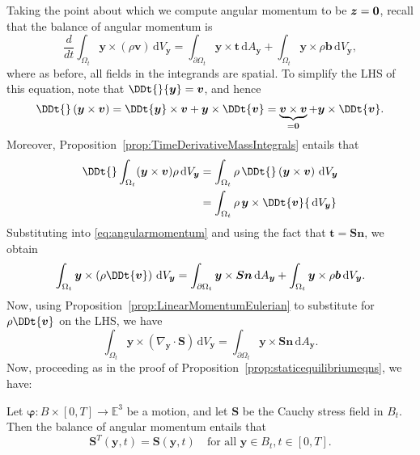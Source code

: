\documentclass[
  letterpaper,
  DIV=11,
  numbers=noendperiod]{scrreprt}
\theoremstyle{plain}
\theoremstyle{remark}
\begin{document}
Taking the point about which we compute angular momentum to be
\({\boldsymbol{z}}=\bf0\), recall that the balance of angular momentum
is \[\label{eq:angularmomentum}
  \frac{d}{dt}\int_{\Omega_t}{\boldsymbol{y}}\times (\rho{\boldsymbol{v}}){\,{\mathrm{d}}V_{{\boldsymbol{y}}}}=\int_{\partial\Omega_t}{\boldsymbol{y}}\times {\boldsymbol{t}}{\,{\mathrm{d}}A_{{\boldsymbol{y}}}}+\int_{\Omega_t}{\boldsymbol{y}}\times \rho{\boldsymbol{b}}{\,{\mathrm{d}}V_{{\boldsymbol{y}}}},\]
where as before, all fields in the integrands are spatial. To simplify
the LHS of this equation, note that
\(\DDt{}{\boldsymbol{y}}= {\boldsymbol{v}}\), and hence
\[\DDt{}\left({\boldsymbol{y}}\times{\boldsymbol{v}}\right) = \DDt{{\boldsymbol{y}}}\times{\boldsymbol{v}}+{\boldsymbol{y}}\times\DDt{{\boldsymbol{v}}} =\underbrace{{\boldsymbol{v}}\times{\boldsymbol{v}}}_{=\bf0}+ {\boldsymbol{y}}\times\DDt{{\boldsymbol{v}}}.\]
Moreover,
Proposition~\hyperref[prop:TimeDerivativeMassIntegrals]{{[}prop:TimeDerivativeMassIntegrals{]}}
entails that \[\begin{aligned}
  \DDt{}\int_{\Omega_t}({\boldsymbol{y}}\times {\boldsymbol{v}})\rho{\,{\mathrm{d}}V_{{\boldsymbol{y}}}}&= \int_{\Omega_t}\rho\,\DDt{}\left({\boldsymbol{y}}\times{\boldsymbol{v}}\right){\,{\mathrm{d}}V_{{\boldsymbol{y}}}}\\
&=\int_{\Omega_t}\rho\,{\boldsymbol{y}}\times\DDt{{\boldsymbol{v}}}{\,{\mathrm{d}}V_{{\boldsymbol{y}}}}
\end{aligned}\] Substituting into
\hyperref[eq:angularmomentum]{{[}eq:angularmomentum{]}} and using the
fact that \({\boldsymbol{t}}={\boldsymbol{S}}{\boldsymbol{n}}\), we
obtain
\[\int_{\Omega_t}{\boldsymbol{y}}\times \left(\rho\DDt{{\boldsymbol{v}}}\right){\,{\mathrm{d}}V_{{\boldsymbol{y}}}}=\int_{\partial\Omega_t}{\boldsymbol{y}}\times {\boldsymbol{S}}{\boldsymbol{n}}{\,{\mathrm{d}}A_{{\boldsymbol{y}}}}+\int_{\Omega_t}{\boldsymbol{y}}\times \rho{\boldsymbol{b}}{\,{\mathrm{d}}V_{{\boldsymbol{y}}}}.\]
Now, using
Proposition~\hyperref[prop:LinearMomentumEulerian]{{[}prop:LinearMomentumEulerian{]}}
to substitute for \(\rho\DDt{\boldsymbol{v}}\) on the LHS, we have
\[\int_{\Omega_t}{\boldsymbol{y}}\times (\nabla_{\boldsymbol{y}}\cdot{\boldsymbol{S}}){\,{\mathrm{d}}V_{{\boldsymbol{y}}}}=\int_{\partial\Omega_t}{\boldsymbol{y}}\times {\boldsymbol{S}}{\boldsymbol{n}}{\,{\mathrm{d}}A_{{\boldsymbol{y}}}}.\]
Now, proceeding as in the proof of
Proposition~\hyperref[prop:staticequilibriumeqns]{{[}prop:staticequilibriumeqns{]}},
we have:

Let \({\boldsymbol{\varphi}}:B\times[0,T]\to{\mathbb{E}}^3\) be a
motion, and let \({\boldsymbol{S}}\) be the Cauchy stress field in
\(B_t\). Then the balance of angular momentum entails that
\[{\boldsymbol{S}}^T({\boldsymbol{y}},t)={\boldsymbol{S}}({\boldsymbol{y}},t)\quad\text{for all }{\boldsymbol{y}}\in B_t, t\in[0,T].\]
\end{document}
